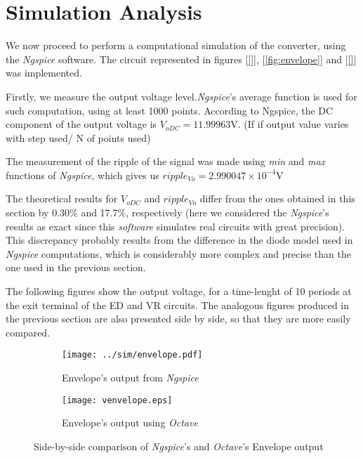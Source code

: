 \section{Simulation Analysis}
\label{sec:simulation}

\par We now proceed to perform a computational simulation of the converter, using the \textit{Ngspice} software. The circuit represented in figures [\ref{}], [\ref{fig:envelope}] and [\ref{}] was implemented.

Firstly, we measure the output voltage level.\textit{Ngspice}'s average function is used for such computation, using at least 1000 points. According to Ngspice, the DC component of the output voltage
is $V_{oDC}=11.99963$V. (If if output value varies with step used/ N of points used)\par
The measurement of the ripple of the signal was made using \textit{min} and \textit{max} functions of \textit{Ngspice}, which gives us $ripple_{Vo}=2.990047 \times 10^{-4}$V

The theoretical results for $V_{oDC}$ and $ripple_{Vo}$ differ from the ones obtained in this section  by 0.30\% and 17.7\%, respectively (here we considered the \textit{Ngspice}'s results as exact since this \textit{software} simulates real circuits with great precision).
This discrepancy probably results from the difference in the diode model used in \textit{Ngspice} computations, which is considerably more complex and precise than the one used in the previous section.

The following figures show the output voltage, for a time-lenght of 10 periods at the exit terminal of the ED and VR circuits.  The analogous figures produced in the previous section are also presented side by side, so that they are more easily compared.

\begin{figure}[H]
\centering
\begin{subfigure}{.5\textwidth}
  \centering
  \texttt{[image: ../sim/envelope.pdf]}
  \caption{Envelope's output from \textit{Ngspice}}
  \label{fig:EnvelopeNGSPICE}
\end{subfigure}%
\begin{subfigure}{.5\textwidth}
  \centering
  \texttt{[image: venvelope.eps]}
  \caption{Envelope's output using \textit{Octave}}
  \label{fig:EnvelopeOCTAVE}
\end{subfigure}
\caption{Side-by-side comparison of \textit{Ngspice}'s and \textit{Octave}'s Envelope output}
\label{fig:EnvelopeComparacao}
\end{figure}

